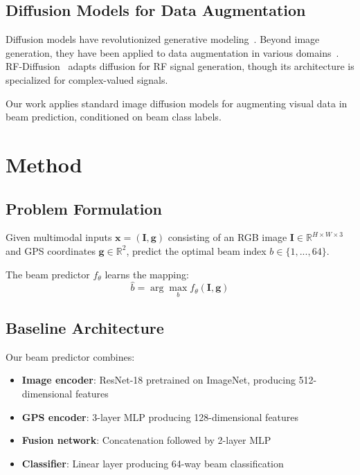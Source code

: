 \documentclass[conference]{IEEEtran}
\begin{document}
\subsection{Diffusion Models for Data Augmentation}

Diffusion models have revolutionized generative modeling~\cite{ddpm2020}. Beyond image generation, they have been applied to data augmentation in various domains~\cite{diffaug2023}. RF-Diffusion~\cite{rfdiffusion2024} adapts diffusion for RF signal generation, though its architecture is specialized for complex-valued signals.

Our work applies standard image diffusion models for augmenting visual data in beam prediction, conditioned on beam class labels.

\section{Method}

\subsection{Problem Formulation}

Given multimodal inputs $\mathbf{x} = (\mathbf{I}, \mathbf{g})$ consisting of an RGB image $\mathbf{I} \in \mathbb{R}^{H \times W \times 3}$ and GPS coordinates $\mathbf{g} \in \mathbb{R}^2$, predict the optimal beam index $b \in \{1, ..., 64\}$.

The beam predictor $f_\theta$ learns the mapping:
\begin{equation}
    \hat{b} = \arg\max_b f_\theta(\mathbf{I}, \mathbf{g})
\end{equation}

\subsection{Baseline Architecture}

Our beam predictor combines:
\begin{itemize}
    \item \textbf{Image encoder}: ResNet-18 pretrained on ImageNet, producing 512-dimensional features
    \item \textbf{GPS encoder}: 3-layer MLP producing 128-dimensional features
    \item \textbf{Fusion network}: Concatenation followed by 2-layer MLP
    \item \textbf{Classifier}: Linear layer producing 64-way beam classification
\end{itemize}
\end{document}
